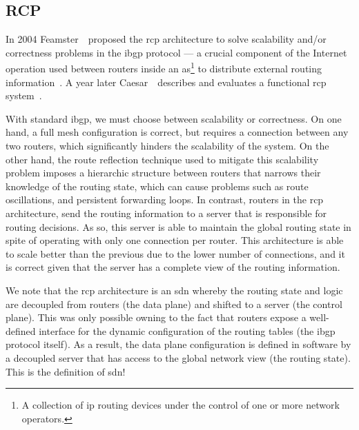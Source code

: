 \subsection{RCP}

In 2004 Feamster~\etal\ proposed the \gls{rcp} architecture to solve scalability and/or correctness problems in the \gls{ibgp} protocol --- 
a crucial component of the Internet operation used between routers inside an \gls{as}\footnote{A collection of \gls{ip} routing devices under the control of one or more network operators.} to distribute external routing information~\cite{Feamster:2004tg}. 
A year later Caesar~\etal\ describes and evaluates a functional \gls{rcp} system~\cite{Caesar:2005ws}. 

With standard \gls{ibgp}, we must choose between scalability or correctness. 
On one hand, a full mesh configuration is correct, but requires a connection between any two routers, which significantly hinders the scalability of the system. 
On the other hand, the route reflection technique used to mitigate this scalability problem imposes a hierarchic structure between routers that narrows their knowledge of the routing state, which can cause problems such as route oscillations, and persistent forwarding loops. 
In contrast, routers in the \gls{rcp} architecture, send the routing information to a server that is responsible for routing decisions. 
As so, this server is able to maintain the global routing state in spite of operating with only one connection per router.
This architecture is able to scale better than the previous due to the lower number of connections, and it is correct given that the server has a complete view of the routing information.  

We note that the \gls{rcp} architecture is an \gls{sdn} whereby the routing state and logic are decoupled from routers (the data plane) and shifted to a server (the control plane). 
This was only possible owning to the fact that routers expose a well-defined interface for the dynamic configuration of the routing tables (the \gls{ibgp} protocol itself). 
As a result, the data plane configuration is defined in software by a decoupled server that has access to the global network view (the routing state). 
This is the definition of \gls{sdn}!

